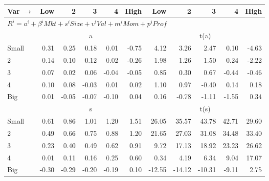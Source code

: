 
\begin{tabular}{lrrrrrrrrrr}
  \toprule
    
    Var $\rightarrow$ & Low & 2 & 3 & 4 & High & Low & 2 & 3 & 4 & High  \\ 
  \midrule
  \multicolumn{11}{l}{$R^i=a^i+\beta^iMkt+s^iSize+v^iVal+m^iMom+p^iProf$}  \\
  
     & \multicolumn{5}{c}{a} & \multicolumn{5}{c}{t(a)}   \\
     \cmidrule(r){2-6} \cmidrule(r){7-11} 
    Small  & 0.31  & 0.25  & 0.18  & 0.01  & -0.75  & 4.12  & 3.26  & 2.47  & 0.10  & -4.63   \\
    2  & 0.14  & 0.10  & 0.12  & 0.02  & -0.26  & 1.98  & 1.26  & 1.50  & 0.24  & -2.22   \\
    3  & 0.07  & 0.02  & 0.06  & -0.04  & -0.05  & 0.85  & 0.30  & 0.67  & -0.44  & -0.46   \\
    4  & 0.10  & 0.08  & -0.03  & 0.01  & 0.02  & 1.10  & 0.97  & -0.40  & 0.14  & 0.18   \\
    Big  & 0.01  & -0.05  & -0.07  & -0.10  & 0.04  & 0.16  & -0.78  & -1.11  & -1.55  & 0.34   \\
    
  
    
  
     & \multicolumn{5}{c}{s} & \multicolumn{5}{c}{t(s)}   \\
     \cmidrule(r){2-6} \cmidrule(r){7-11} 
    Small  & 0.61  & 0.86  & 1.01  & 1.20  & 1.51  & 26.05  & 35.57  & 43.78  & 42.71  & 29.60   \\
    2  & 0.49  & 0.66  & 0.75  & 0.88  & 1.20  & 21.65  & 27.03  & 31.08  & 34.48  & 33.40   \\
    3  & 0.23  & 0.40  & 0.49  & 0.62  & 0.91  & 9.72  & 17.13  & 18.92  & 23.23  & 26.62   \\
    4  & 0.01  & 0.11  & 0.16  & 0.25  & 0.60  & 0.34  & 4.19  & 6.34  & 9.04  & 17.07   \\
    Big  & -0.30  & -0.29  & -0.20  & -0.19  & 0.10  & -12.55  & -14.12  & -10.31  & -9.11  & 2.75   \\
    

\end{tabular}
